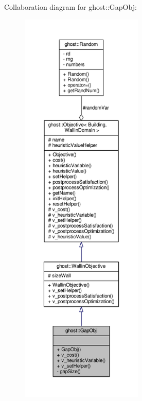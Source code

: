 Collaboration diagram for ghost\-:\-:Gap\-Obj\-:
\nopagebreak
\begin{figure}[H]
\begin{center}
\leavevmode
\includegraphics[height=550pt]{classghost_1_1GapObj__coll__graph}
\end{center}
\end{figure}
